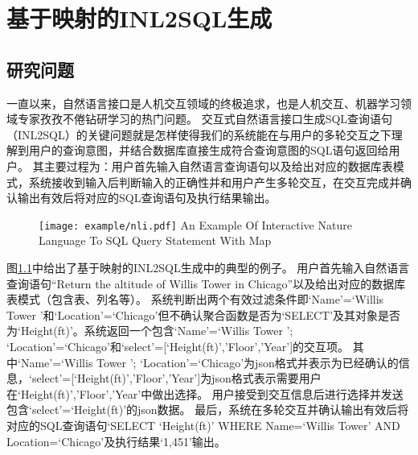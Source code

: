 \chapter{基于映射的INL2SQL生成}
\label{chap:interaction}
\section{研究问题}

一直以来，自然语言接口是人机交互领域的终极追求，也是人机交互、机器学习领域专家孜孜不倦钻研学习的热门问题。
交互式自然语言接口生成SQL查询语句（INL2SQL）的关键问题就是怎样使得我们的系统能在与用户的多轮交互之下理解到用户的查询意图，并结合数据库直接生成符合查询意图的SQL语句返回给用户。
其主要过程为：用户首先输入自然语言查询语句以及给出对应的数据库表模式，系统接收到输入后判断输入的正确性并和用户产生多轮交互，在交互完成并确认输出有效后将对应的SQL查询语句及执行结果输出。

\begin{figure}[!htp]
  \centering
  \texttt{[image: example/nli.pdf]}
    {An Example Of Interactive Nature Language To SQL Query Statement With Map}
  \label{fig:NLI}
\end{figure}



图\ref{fig:NLI}中给出了基于映射的INL2SQL生成中的典型的例子。
用户首先输入自然语言查询语句“Return the altitude of Willis Tower in Chicago”以及给出对应的数据库表模式（包含表、列名等）。
系统判断出两个有效过滤条件即‘Name’=‘Willis Tower ’和‘Location’=‘Chicago’但不确认聚合函数是否为‘SELECT’及其对象是否为‘Height(ft)’。系统返回一个包含{‘Name’=‘Willis Tower ’; ‘Location’=‘Chicago’}和{‘select’=[‘Height(ft)’,’Floor’,’Year’]}的交互项。
其中{‘Name’=‘Willis Tower ’; ‘Location’=‘Chicago’}为json格式并表示为已经确认的信息，{‘select’=[‘Height(ft)’,’Floor’,’Year’]}为json格式表示需要用户在‘Height(ft)’,’Floor’,’Year’中做出选择。
用户接受到交互信息后进行选择并发送包含{‘select’=‘Height(ft)’}的json数据。
最后，系统在多轮交互并确认输出有效后将对应的SQL查询语句‘SELECT ‘Height(ft)’ WHERE Name=‘Willis Tower’ AND Location=‘Chicago’及执行结果‘1,451’输出。





